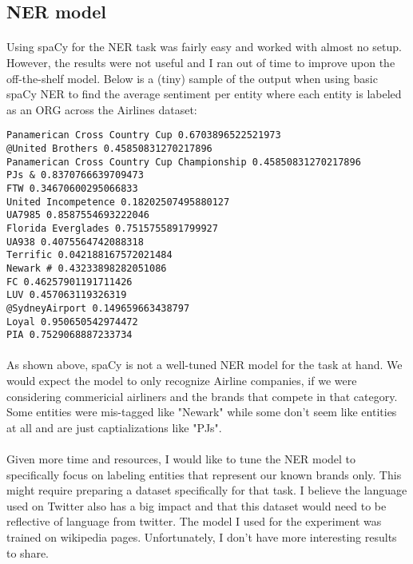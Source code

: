 \documentclass{article}
\begin{document}
\subsection{NER model}

\paragraph{} Using spaCy for the NER task was fairly easy and worked with almost no setup. However, the results were not useful and I ran out of time to improve upon the off-the-shelf model. Below is a (tiny) sample of the output when using basic spaCy NER to find the average sentiment per entity where each entity is labeled as an ORG across the Airlines dataset:

\begin{verbatim}
Panamerican Cross Country Cup 0.6703896522521973
@United Brothers 0.45850831270217896
Panamerican Cross Country Cup Championship 0.45850831270217896
PJs & 0.8370766639709473
FTW 0.34670600295066833
United Incompetence 0.18202507495880127
UA7985 0.8587554693222046
Florida Everglades 0.7515755891799927
UA938 0.4075564742088318
Terrific 0.042188167572021484
Newark # 0.43233898282051086
FC 0.46257901191711426
LUV 0.457063119326319
@SydneyAirport 0.149659663438797
Loyal 0.950650542974472
PIA 0.7529068887233734
\end{verbatim}

\paragraph{} As shown above, spaCy is not a well-tuned NER model for the task at hand. We would expect the model to only recognize Airline companies, if we were considering commericial airliners and the brands that compete in that category. Some entities were mis-tagged like "Newark" while some don't seem like entities at all and are just captializations like "PJs".

\paragraph{} Given more time and resources, I would like to tune the NER model to specifically focus on labeling entities that represent our known brands only. This might require preparing a dataset specifically for that task. I believe the language used on Twitter also has a big impact and that this dataset would need to be reflective of language from twitter. The model I used for the experiment was trained on wikipedia pages. Unfortunately, I don't have more interesting results to share.
\end{document}
